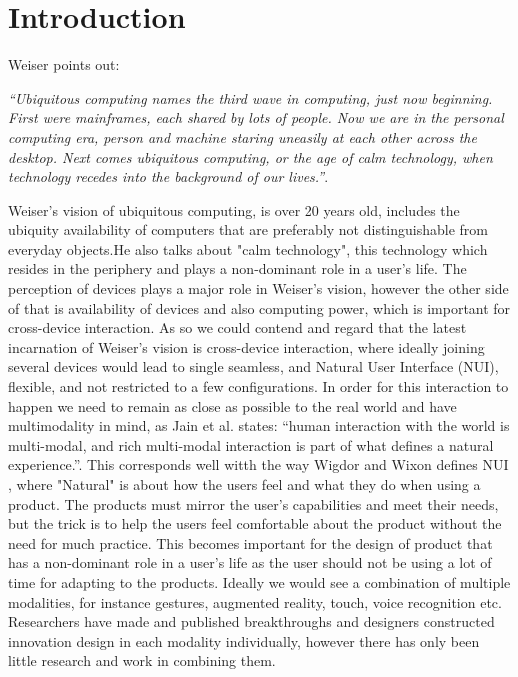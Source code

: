 \section{Introduction}
Weiser\cite{Weiser:1991} points out:
 
{\em``Ubiquitous computing names the third wave in computing, just now beginning. First were mainframes, each shared by lots of people. Now we are in the personal computing era, person and machine staring uneasily at each other across the desktop. Next comes ubiquitous computing, or the age of calm technology, when technology recedes into the background of our lives.''}.

Weiser's vision of ubiquitous computing, is over 20 years old, includes the ubiquity availability of computers that are preferably not distinguishable from everyday objects.He also talks about "calm technology", this technology which resides in the periphery and plays a non-dominant role in a user's life. The perception of devices plays a major role in Weiser's vision, however the other side of that is availability of devices and also computing power, which is important for cross-device interaction. As so we could contend and regard that the latest incarnation of Weiser's vision is cross-device interaction, where ideally joining several devices would lead to single seamless, and Natural User Interface (NUI), flexible, and not restricted to a few configurations\cite{Radle:2015}.
In order for this interaction to happen we need to remain as close as possible to the real world and have multimodality in mind, as Jain et al. states: ``human interaction with the world is multi-modal, and rich multi-modal interaction is part of what defines a natural experience.''\cite{Jain:2011}. 
This corresponds well witth the way Wigdor and Wixon defines NUI , where "Natural" is about how the users feel and what they do when using a product. The products must mirror the user's capabilities and meet their needs, but the trick is to help the users feel comfortable about the product without the need for much practice.\cite{Wigdor:2011} This becomes important for the design of product that has a non-dominant role in a user's life as the user should not be using a lot of time for adapting to the products.   
Ideally we would see a combination of multiple modalities, for instance gestures, augmented reality, touch, voice recognition etc. 
Researchers have made and published breakthroughs and designers constructed innovation design in each modality individually, however there has only been little research and work in combining them.\cite{Jain:2011} \\

